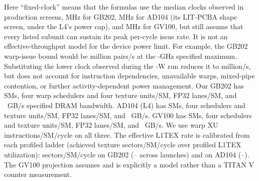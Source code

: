 Here ``fixed-clock'' means that the formulas use the median clocks observed in
production screens, \RooflineBlackwellObservedClockMHz{} MHz for GB202,
\RooflineLFourObservedClockMHz{} MHz for AD104 (its LIT-PCBA shape screen, under
the L4's power cap), and \RooflineTitanObservedClockMHz{} MHz for GV100, but still assume that every
listed subunit can sustain its peak per-cycle issue rate. It is not an
effective-throughput model for the device power limit. For example, the
GB202 warp-issue bound would be
\RooflineBlackwellMaxClockIssueMillionPairsPerSecond{} million pairs/s at the
\RooflineBlackwellSpecifiedMaxClockGHz-GHz specified maximum. Substituting the lower clock observed during the
\RooflineBlackwellPowerLimitW-W run reduces it to
\RooflineBlackwellFieldStructuralMillionPairsPerSecond{} million/s, but does
not account for instruction dependencies, unavailable warps, mixed-pipe
contention, or further activity-dependent power management. Our GB202 has \RooflineBlackwellSms{}
SMs, four warp schedulers and four texture units/SM, \RooflineBlackwellFpLanesPerSm{} FP32 lanes/SM, and
\RooflineBlackwellDramGigabytesPerSecond~GB/s specified DRAM bandwidth. AD104 (L4) has \RooflineLFourSms{} SMs, four
schedulers and texture units/SM, \RooflineLFourFpLanesPerSm{} FP32 lanes/SM, and \RooflineLFourDramGigabytesPerSecond~GB/s.
GV100 has \RooflineTitanSms{} SMs, four schedulers and texture
units/SM, \RooflineTitanFpLanesPerSm{} FP32 lanes/SM, and \RooflineTitanDramGigabytesPerSecond~GB/s. We use \RooflineXuWarpInstructionsPerSmCycle{} warp XU
instructions/SM/cycle on all three. The effective L1TEX rate is calibrated from each profiled
ladder (achieved texture sectors/SM/cycle over profiled L1TEX utilization):
\RooflineBlackwellLoneTexSectorsPerSmCycle{} sectors/SM/cycle on GB202
(\RooflineBlackwellLoneTexSectorsPerSmCycleMin{}--\RooflineBlackwellLoneTexSectorsPerSmCycleMax{}
across launches) and \RooflineLFourLoneTexSectorsPerSmCycle{} on AD104
(\RooflineLFourLoneTexSectorsPerSmCycleMin{}--\RooflineLFourLoneTexSectorsPerSmCycleMax{}). The GV100 projection
assumes \RooflineTitanLoneTexSectorsPerSmCycle{} and is explicitly a model rather than a TITAN V counter
measurement.

